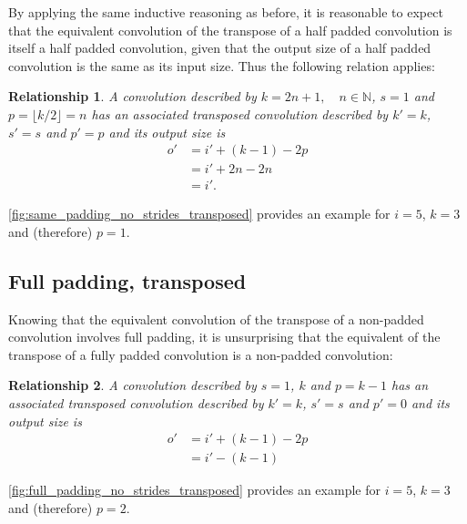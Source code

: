 \documentclass[notitlepage]{report}
\newtheorem{relationship}{Relationship}
\begin{document}
By applying the same inductive reasoning as before, it is reasonable to expect
that the equivalent convolution of the transpose of a half padded convolution
is itself a half padded convolution, given that the output size of a half
padded convolution is the same as its input size. Thus the following relation
applies:

\begin{relationship}\label{rel:half_padding_no_strides_transposed}
A convolution described by $k = 2n + 1, \quad n \in \mathbb{N}$, $s = 1$ and $p
= \lfloor k / 2 \rfloor = n$ has an associated transposed convolution described
by $k' = k$, $s' = s$ and $p' = p$ and its output size is
\begin{equation*}
\begin{split}
    o' &= i' + (k - 1) - 2p \\
       &= i' + 2n - 2n \\
       &= i'.
\end{split}
\end{equation*}
\end{relationship}

\autoref{fig:same_padding_no_strides_transposed} provides an example for $i =
5$, $k = 3$ and (therefore) $p = 1$.

\subsection{Full padding, transposed}

Knowing that the equivalent convolution of the transpose of a non-padded
convolution involves full padding, it is unsurprising that the equivalent of
the transpose of a fully padded convolution is a non-padded convolution:

\begin{relationship}\label{rel:full_padding_no_strides_transposed}
A convolution described by $s = 1$, $k$ and $p = k - 1$ has an
associated transposed convolution described by $k' = k$, $s' = s$ and $p' = 0$
and its output size is
\begin{equation*}
\begin{split}
    o' &= i' + (k - 1) - 2p \\
       &= i' - (k - 1)
\end{split}
\end{equation*}
\end{relationship}

\autoref{fig:full_padding_no_strides_transposed} provides an example for $i =
5$, $k = 3$ and (therefore) $p = 2$.
\end{document}
